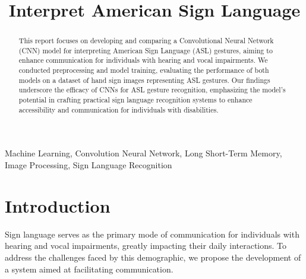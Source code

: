 \documentclass[conference]{IEEEtran}
\begin{document}
\title{\textbf{Interpret American Sign Language}}

\author{
\and
{} 
}

\maketitle

\begin{abstract}
  \hspace{0.5ex}
  This report focuses on developing and comparing a Convolutional Neural Network (CNN) model for interpreting American Sign Language (ASL) gestures, aiming to enhance communication for individuals with hearing and vocal impairments. We conducted preprocessing and model training, evaluating the performance of both models on a dataset of hand sign images representing ASL gestures. Our findings underscore the efficacy of CNNs for ASL gesture recognition, emphasizing the model’s potential in crafting practical sign language recognition systems to enhance accessibility and communication for individuals with disabilities.
\end{abstract}

\vspace{\baselineskip}

\begin{IEEEkeywords}
  \hspace{1ex}
  Machine Learning, Convolution Neural Network,  Long Short-Term Memory, Image Processing, Sign Language Recognition 
\end{IEEEkeywords}

\section{Introduction}

{\LARGE S}{ign} language serves as the primary mode of communication for individuals with hearing and vocal impairments, greatly impacting their daily interactions. To address the challenges faced by this demographic, we propose the development of a system aimed at facilitating communication.
\vspace{\baselineskip}
\end{document}
